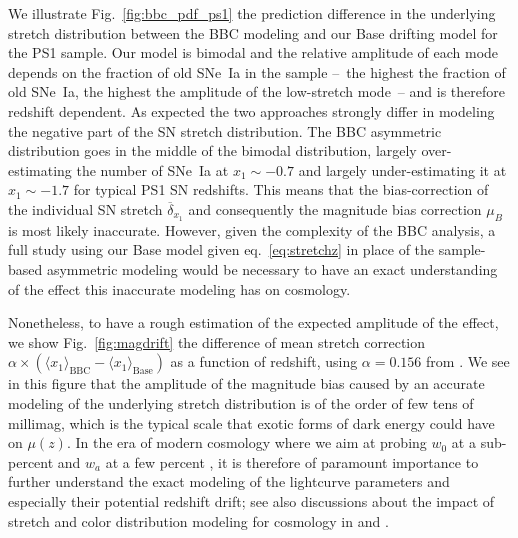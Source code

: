 \documentclass[]{aa} %
\newcommand{\mr}[1]{{\textcolor[rgb]{0.60,0.10,0.6}{#1}}}
\begin{document}
\mr{We illustrate Fig.~\ref{fig:bbc_pdf_ps1} the prediction difference in the
underlying stretch distribution between the BBC modeling and our Base drifting
model for the PS1 sample. Our model is bimodal and the relative
amplitude of each mode depends on the fraction of old SNe~Ia in the sample
--~the highest the fraction of old SNe~Ia, the highest the amplitude of the
low-stretch mode~-- and is therefore redshift dependent. As expected the two
approaches strongly differ in modeling the negative part of the SN stretch
distribution. The BBC asymmetric distribution goes in the middle of the bimodal
distribution, largely over-estimating the number of SNe~Ia at $x_1\sim-0.7$ and
largely under-estimating it at $x_1\sim-1.7$ for typical PS1 SN redshifts. This
means that the bias-correction of the individual SN stretch
$\overline{\delta}_{x_1}$ \citep{kessler2017} and consequently the magnitude
bias correction $\mu_B$ is most likely inaccurate. However, given the complexity
of the BBC analysis, a full study using our Base model given
eq.~\ref{eq:stretchz} in place of the sample-based asymmetric modeling would be
necessary to have an exact understanding of the effect this inaccurate modeling
has on cosmology.}

\mr{Nonetheless, to have a rough estimation of the expected amplitude of the
effect, we show Fig.~\ref{fig:magdrift} the difference of mean stretch
correction $\alpha\times\left(\langle x_1 \rangle_{\mathrm{BBC}} - \langle x_1
\rangle_{\mathrm{Base}}\right)$ as a function of redshift, using $\alpha=0.156$
from \cite{scolnic2018a}. We see in this figure that the amplitude of the
magnitude bias caused by an accurate modeling of the underlying stretch
distribution is of the order of few tens of millimag, which is the typical scale
that exotic forms of dark energy could have on $\mu(z)$. In the era of modern
cosmology where we aim at probing $w_0$ at a sub-percent and $w_a$ at a few
percent \citep[e.g.,][]{lsstpaper}, it is therefore of paramount importance to
further understand the exact modeling of the lightcurve parameters and
especially their potential redshift drift; see also discussions about the impact
of stretch and color distribution modeling for cosmology in \citealt{rubin2015}
and \citealt{rubin2016}.}
\end{document}

